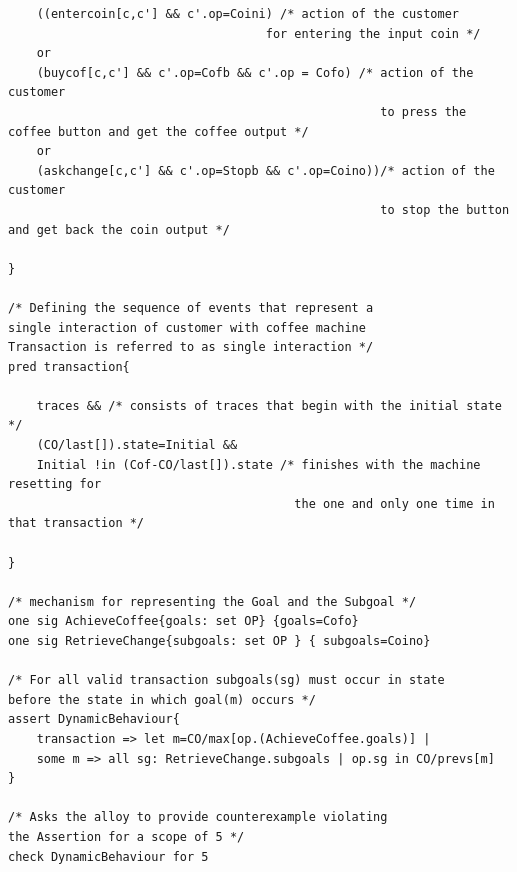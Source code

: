 \documentclass[a4paper,12pt]{report}
\begin{document}
\begin{verbatim}
	((entercoin[c,c'] && c'.op=Coini) /* action of the customer 
									for entering the input coin */
	or
	(buycof[c,c'] && c'.op=Cofb && c'.op = Cofo) /* action of the customer 
													to press the coffee button and get the coffee output */
	or
	(askchange[c,c'] && c'.op=Stopb && c'.op=Coino))/* action of the customer 
													to stop the button and get back the coin output */

}

/* Defining the sequence of events that represent a 
single interaction of customer with coffee machine
Transaction is referred to as single interaction */
pred transaction{

	traces && /* consists of traces that begin with the initial state */
	(CO/last[]).state=Initial &&
	Initial !in (Cof-CO/last[]).state /* finishes with the machine resetting for 
										the one and only one time in that transaction */

}

/* mechanism for representing the Goal and the Subgoal */
one sig AchieveCoffee{goals: set OP} {goals=Cofo}
one sig RetrieveChange{subgoals: set OP } { subgoals=Coino}

/* For all valid transaction subgoals(sg) must occur in state 
before the state in which goal(m) occurs */
assert DynamicBehaviour{
	transaction => let m=CO/max[op.(AchieveCoffee.goals)] |
	some m => all sg: RetrieveChange.subgoals | op.sg in CO/prevs[m]
}

/* Asks the alloy to provide counterexample violating 
the Assertion for a scope of 5 */
check DynamicBehaviour for 5


\end{verbatim}
\end{document}
